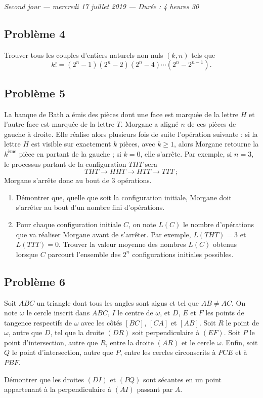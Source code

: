 \bigskip
\begin{center}
  \emph{Second jour --- mercredi 17 juillet 2019 --- Durée : 4 heures 30}
\end{center}

\subsection*{Problème 4}
Trouver tous les couples d'entiers naturels non nuls $(k, n)$ tels que
\[
k! = (2^n - 1)(2^n - 2)(2^n - 4)\cdots(2^n - 2^{n-1}).
\]

\subsection*{Problème 5}
La banque de Bath a émis des pièces dont une face est marquée de la lettre $H$ et l'autre face est marquée de
la lettre $T$. Morgane a aligné $n$ de ces pièces de gauche à droite. Elle réalise alors plusieurs fois de suite
l'opération suivante : si la lettre $H$ est visible sur exactement $k$ pièces, avec $k \geqslant 1$, alors
Morgane retourne la $k^{\text{ème}}$ pièce en partant de la gauche ; si $k = 0$, elle s'arrête. Par exemple,
si $n = 3$, le processus partant de la configuration $THT$ sera
\[
THT \to HHT \to HTT \to TTT\,;
\]
Morgane s'arrête donc au bout de $3$ opérations.
\begin{enumerate}
  \item[(a)] Démontrer que, quelle que soit la configuration initiale, Morgane doit s'arrêter au bout d'un
  nombre fini d'opérations.
  \item[(b)] Pour chaque configuration initiale $C$, on note $L(C)$ le nombre d'opérations que va réaliser
  Morgane avant de s'arrêter. Par exemple, $L(THT) = 3$ et $L(TTT) = 0$. Trouver la valeur moyenne des nombres
  $L(C)$ obtenus lorsque $C$ parcourt l'ensemble des $2^n$ configurations initiales possibles.
\end{enumerate}

\subsection*{Problème 6}
Soit $ABC$ un triangle dont tous les angles sont aigus et tel que $AB \neq AC$. On note $\omega$ le cercle
inscrit dans $ABC$, $I$ le centre de $\omega$, et $D$, $E$ et $F$ les points de tangence respectifs de $\omega$
avec les côtés $[BC]$, $[CA]$ et $[AB]$. Soit $R$ le point de $\omega$, autre que $D$, tel que la droite $(DR)$
soit perpendiculaire à $(EF)$. Soit $P$ le point d'intersection, autre que $R$, entre la droite $(AR)$ et le
cercle $\omega$. Enfin, soit $Q$ le point d'intersection, autre que $P$, entre les cercles circonscrits à
$PCE$ et à $PBF$.

Démontrer que les droites $(DI)$ et $(PQ)$ sont sécantes en un point appartenant à la perpendiculaire à $(AI)$
passant par $A$.
